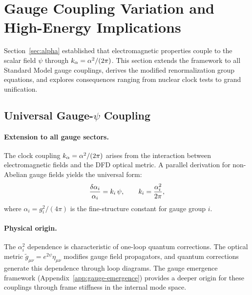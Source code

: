 
\section{Gauge Coupling Variation and High-Energy Implications}\label{sec:gauge-coupling}

Section~\ref{sec:alpha} established that electromagnetic properties couple to the scalar field $\psi$ through $k_\alpha = \alpha^2/(2\pi)$. This section extends the framework to all Standard Model gauge couplings, derives the modified renormalization group equations, and explores consequences ranging from nuclear clock tests to grand unification.

\subsection{Universal Gauge-$\psi$ Coupling}\label{sec:gauge-universal}

\paragraph{Extension to all gauge sectors.}
The clock coupling $k_\alpha = \alpha^2/(2\pi)$ arises from the interaction between electromagnetic fields and the DFD optical metric. A parallel derivation for non-Abelian gauge fields yields the universal form:
\begin{equation}\label{eq:ki-universal}
\frac{\delta\alpha_i}{\alpha_i} = k_i\,\psi, \qquad k_i = \frac{\alpha_i^2}{2\pi},
\end{equation}
where $\alpha_i = g_i^2/(4\pi)$ is the fine-structure constant for gauge group $i$.

\paragraph{Physical origin.}
The $\alpha_i^2$ dependence is characteristic of one-loop quantum corrections. The optical metric $\tilde{g}_{\mu\nu} = e^{2\psi}\eta_{\mu\nu}$ modifies gauge field propagators, and quantum corrections generate this dependence through loop diagrams. The gauge emergence framework (Appendix~\ref{app:gauge-emergence}) provides a deeper origin for these couplings through frame stiffness in the internal mode space.

